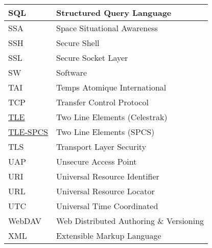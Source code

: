 \documentclass[dec_sum_main.tex]{subfiles}
\begin{document}
\begin{longtable}{|m{2.8cm}|m{10cm}|}
	SQL & Structured Query Language \\ \hline
	SSA & Space Situational Awareness \\ \hline
	SSH & Secure Shell \\ \hline
	SSL & Secure Socket Layer \\ \hline
	SW & Software \\ \hline
	TAI & Temps Atomique International \\ \hline
	TCP & Transfer Control Protocol \\ \hline
    \href{https://www.celestrak.com/NORAD/documentation/tle-fmt.php}{TLE} & Two Line Elements (Celestrak)\\ \hline    
	\href{https://www.space-track.org/documentation#tle}{TLE-SPCS} & Two Line Elements (SPCS)\\ \hline
	TLS & Transport Layer Security \\ \hline
	UAP & Unsecure Access Point \\ \hline
    URI & Universal Resource Identifier \\ \hline
	URL & Universal Resource Locator \\ \hline
	UTC & Universal Time Coordinated \\ \hline
	WebDAV & Web Distributed Authoring \& Versioning \\ \hline
	XML & Extensible Markup Language \\ \hline						
\end{longtable}
\end{document}
